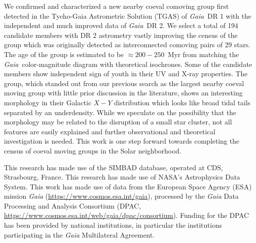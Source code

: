 \documentclass[modern,letterpaper]{aastex61}
\newcommand{\project}[1]{\textsl{#1}}
\newcommand{\acronym}[1]{{\small{#1}}}
\newcommand{\gaia}{\project{Gaia}}
\newcommand{\tgas}{\acronym{TGAS}}
\begin{document}
We confirmed and characterized a new nearby coeval comoving group first detected
in the Tycho-Gaia Astrometric Solution (\tgas) of \gaia\ DR 1 with
the independent and much improved data of \gaia\ DR 2.
We select a total of 194 candidate members with DR 2 astrometry
vastly improving the census of the group which was originally detected as
interconnected comoving pairs of 29 stars.
The age of the group is estimated to be $\approx200-250$~Myr from
matching the \gaia\ color-magnitude diagram with theoretical isochrones.
Some of the candidate members show independent sign of youth in their
UV and X-ray properties.
The group, which standed out from our previous search as the largest nearby
coeval moving group with little prior discussion in the literature,
shows an interesting morphology in their Galactic $X-Y$ distribution
which looks like broad tidal tails separated by an underdensity.
While we speculate on the possibility that the morphology may be related
to the disruption of a small star cluster,
not all features are easily explained and further
observational and theoretical investigation is needed.
This work is one step forward towards completing the census of
coeval moving groups in the Solar neighborhood.




\acknowledgements %
This research has made use of the SIMBAD database,
operated at CDS, Strasbourg, France.
This research has made use of NASA's Astrophysics Data System.
This work has made use of data from the European Space Agency (ESA) mission
{\it Gaia} (\url{https://www.cosmos.esa.int/gaia}), processed by the {\it Gaia}
Data Processing and Analysis Consortium (DPAC,
\url{https://www.cosmos.esa.int/web/gaia/dpac/consortium}). Funding for the DPAC
has been provided by national institutions, in particular the institutions
participating in the {\it Gaia} Multilateral Agreement.




\end{document}
